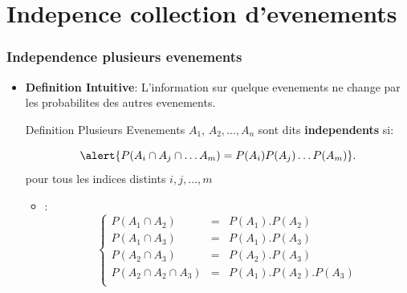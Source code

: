 \documentclass{beamer}
\begin{document}
\section{Indepence collection d'evenements}
\begin{frame}[t]
  \frametitle{Independence plusieurs evenements}
 \begin{itemize}
   \small
   \item \textbf{Definition Intuitive}: L'information sur quelque evenements ne
     change par les probabilites des autres evenements.
     \pause
     \begin{block}{Definition}
      \scriptsize 
      Plusieurs Evenements $A_1$, $A_2,\ldots, A_n$ sont dits
      \alert{\textbf{independents}} si:

      \begin{equation*}
        \alert{P(A_i\cap A_j\cap \ldots A_m) = P(A_i)P(A_j)\ldots P(A_m)} .
      \end{equation*}
pour tous les indices distints $i,j,\ldots, m$
     \end{block}
\pause
     \begin{itemize}
       \item {}:
$$
\left\{
  \begin{array}{lll}
    P(A_1\cap A_2) &=& P(A_1).P(A_2) \\
    P(A_1\cap A_3) &=& P(A_1).P(A_3) \\
    P(A_2\cap A_3) &=& P(A_2).P(A_3) \\
    P(A_2\cap A_2\cap A_3) &=& P(A_1).P(A_2).P(A_3) \\
  \end{array}\right.
$$
     \end{itemize}
 \end{itemize} 
\end{frame}
\end{document}
